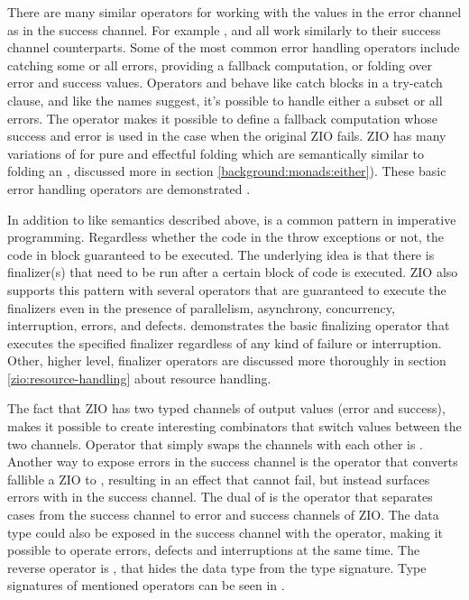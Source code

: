 There are many similar operators for working with the values in the error channel as in the success channel. For example ,  and  all work similarly to their success channel counterparts. Some of the most common error handling operators include catching some or all errors, providing a fallback computation, or folding over error and success values. Operators  and  behave like catch blocks in a try-catch clause, and like the names suggest, it's possible to handle either a subset or all errors. The  operator makes it possible to define a fallback computation whose success and error is used in the case when the original ZIO fails. ZIO has many variations of  for pure and effectful folding which are semantically similar to folding an , discussed more in section \ref{background:monads:either}). These basic error handling operators are demonstrated .



In addition to  like semantics described above,  is a common pattern in imperative programming. Regardless whether the code in the  throw exceptions or not, the code in  block guaranteed to be executed. The underlying idea is that there is finalizer(s) that need to be run after a certain block of code is executed. ZIO also supports this pattern with several operators that are guaranteed to execute the finalizers even in the presence of parallelism, asynchrony, concurrency, interruption, errors, and defects.   demonstrates the basic finalizing operator  that executes the specified finalizer regardless of any kind of failure or interruption. Other, higher level, finalizer operators are discussed more thoroughly in section \ref{zio:resource-handling} about resource handling.



The fact that ZIO has two typed channels of output values (error and success), makes it possible to create interesting combinators that switch values between the two channels. Operator that simply swaps the channels with each other is . Another way to expose errors in the success channel is the  operator that converts fallible a ZIO to , resulting in an effect that cannot fail, but instead surfaces errors with  in the success channel. The dual of  is the operator  that separates  cases from the success channel to error and success channels of ZIO. The  data type could also be exposed in the success channel with the  operator, making it possible to operate errors, defects and interruptions at the same time. The reverse operator is , that hides the  data type from the type signature. Type signatures of mentioned operators can be seen in .

